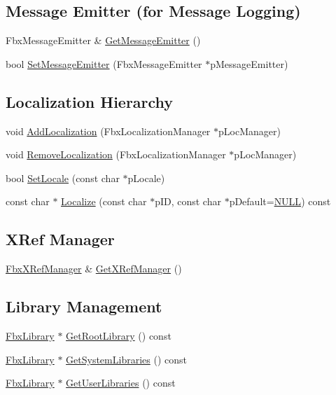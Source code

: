 \subsection*{Message Emitter (for Message Logging)}
\begin{DoxyCompactItemize}
\item 
Fbx\+Message\+Emitter \& \hyperlink{class_fbx_manager_a0803b7fc85be2911a75423e64ccafb4a}{Get\+Message\+Emitter} ()
\item 
bool \hyperlink{class_fbx_manager_abd21131f9e68869f0f575ea177c337e8}{Set\+Message\+Emitter} (Fbx\+Message\+Emitter $\ast$p\+Message\+Emitter)
\end{DoxyCompactItemize}
\subsection*{Localization Hierarchy}
\begin{DoxyCompactItemize}
\item 
void \hyperlink{class_fbx_manager_adf2f27440cd29bed880f944a0f83831b}{Add\+Localization} (Fbx\+Localization\+Manager $\ast$p\+Loc\+Manager)
\item 
void \hyperlink{class_fbx_manager_aa1210548acce876de3a8ed42fba54a46}{Remove\+Localization} (Fbx\+Localization\+Manager $\ast$p\+Loc\+Manager)
\item 
bool \hyperlink{class_fbx_manager_a3a0c4e7cf1ad942b6af60e0a67eda9f5}{Set\+Locale} (const char $\ast$p\+Locale)
\item 
const char $\ast$ \hyperlink{class_fbx_manager_abfc32a6436a410dbc2db564a73462c03}{Localize} (const char $\ast$p\+ID, const char $\ast$p\+Default=\hyperlink{fbxarch_8h_a070d2ce7b6bb7e5c05602aa8c308d0c4}{N\+U\+LL}) const
\end{DoxyCompactItemize}
\subsection*{X\+Ref Manager}
\begin{DoxyCompactItemize}
\item 
\hyperlink{class_fbx_x_ref_manager}{Fbx\+X\+Ref\+Manager} \& \hyperlink{class_fbx_manager_a36bfe163f5c00634de9e102600a71f8d}{Get\+X\+Ref\+Manager} ()
\end{DoxyCompactItemize}
\subsection*{Library Management}
\begin{DoxyCompactItemize}
\item 
\hyperlink{class_fbx_library}{Fbx\+Library} $\ast$ \hyperlink{class_fbx_manager_abc14fc10d71fedc5932bc44cc1b63312}{Get\+Root\+Library} () const
\item 
\hyperlink{class_fbx_library}{Fbx\+Library} $\ast$ \hyperlink{class_fbx_manager_a4b1aa7141334ae101be5405f406c644f}{Get\+System\+Libraries} () const
\item 
\hyperlink{class_fbx_library}{Fbx\+Library} $\ast$ \hyperlink{class_fbx_manager_a9eda0b9c72884386d1dedfd80d34735a}{Get\+User\+Libraries} () const
\end{DoxyCompactItemize}
